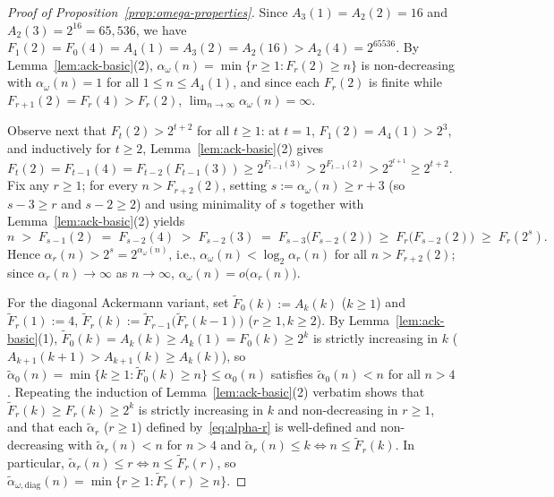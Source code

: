\documentclass[11pt]{article}
\theoremstyle{definition}
\theoremstyle{remark}
\begin{document}
\begin{proof}[Proof of Proposition~\ref{prop:omega-properties}]
Since $A_3(1) = A_2(2) = 16$ and $A_2(3) = 2^{16} = 65{,}536$, we have $F_1(2) = F_0(4) = A_4(1) = A_3(2) = A_2(16) > A_2(4) = 2^{65536}$. By Lemma~\ref{lem:ack-basic}(2), $\alpha_\omega(n) = \min\{r \ge 1 : F_r(2) \ge n\}$ is non-decreasing with $\alpha_\omega(n) = 1$ for all $1 \le n \le A_4(1)$, and since each $F_r(2)$ is finite while $F_{r+1}(2) = F_r(4) > F_r(2)$, $\lim_{n \to \infty} \alpha_\omega(n) = \infty$.

Observe next that $F_t(2) > 2^{t+2}$ for all $t \ge 1$: at $t = 1$, $F_1(2) = A_4(1) > 2^3$, and inductively for $t \ge 2$, Lemma~\ref{lem:ack-basic}(2) gives $F_t(2) = F_{t-1}(4) = F_{t-2}(F_{t-1}(3)) \ge 2^{F_{t-1}(3)} > 2^{F_{t-1}(2)} > 2^{2^{t+1}} \ge 2^{t+2}$. Fix any $r \ge 1$; for every $n > F_{r+2}(2)$, setting $s := \alpha_\omega(n) \ge r + 3$ (so $s - 3 \ge r$ and $s - 2 \ge 2$) and using minimality of $s$ together with Lemma~\ref{lem:ack-basic}(2) yields
\[
n \;>\; F_{s-1}(2) \;=\; F_{s-2}(4) \;>\; F_{s-2}(3) \;=\; F_{s-3}\big(F_{s-2}(2)\big) \;\ge\; F_r\big(F_{s-2}(2)\big) \;\ge\; F_r(2^s).
\]
Hence $\alpha_r(n) > 2^s = 2^{\alpha_\omega(n)}$, i.e., $\alpha_\omega(n) < \log_2 \alpha_r(n)$ for all $n > F_{r+2}(2)$; since $\alpha_r(n) \to \infty$ as $n \to \infty$, $\alpha_\omega(n) = o\big(\alpha_r(n)\big)$.

For the diagonal Ackermann variant, set $\widetilde{F}_0(k) := A_k(k)$ ($k \ge 1$) and $\widetilde{F}_r(1) := 4$, $\widetilde{F}_r(k) := \widetilde{F}_{r-1}\big(\widetilde{F}_r(k - 1)\big)$ ($r \ge 1, k \ge 2$). By Lemma~\ref{lem:ack-basic}(1), $\widetilde{F}_0(k) = A_k(k) \ge A_k(1) = F_0(k) \ge 2^k$ is strictly increasing in $k$ ($A_{k+1}(k + 1) > A_{k+1}(k) \ge A_k(k)$), so $\widetilde{\alpha}_0(n) = \min\{k \ge 1 : \widetilde{F}_0(k) \ge n\} \le \alpha_0(n)$ satisfies $\widetilde{\alpha}_0(n) < n$ for all $n > 4$. Repeating the induction of Lemma~\ref{lem:ack-basic}(2) verbatim shows that $\widetilde{F}_r(k) \ge F_r(k) \ge 2^k$ is strictly increasing in $k$ and non-decreasing in $r \ge 1$, and that each $\widetilde{\alpha}_r$ ($r \ge 1$) defined by~\eqref{eq:alpha-r} is well-defined and non-decreasing with $\widetilde{\alpha}_r(n) < n$ for $n > 4$ and $\widetilde{\alpha}_r(n) \le k \iff n \le \widetilde{F}_r(k)$. In particular, $\widetilde{\alpha}_r(n) \le r \iff n \le \widetilde{F}_r(r)$, so $\widetilde{\alpha}_{\omega,\mathrm{diag}}(n) = \min\{r \ge 1 : \widetilde{F}_r(r) \ge n\}$.


\end{proof}
\end{document}
